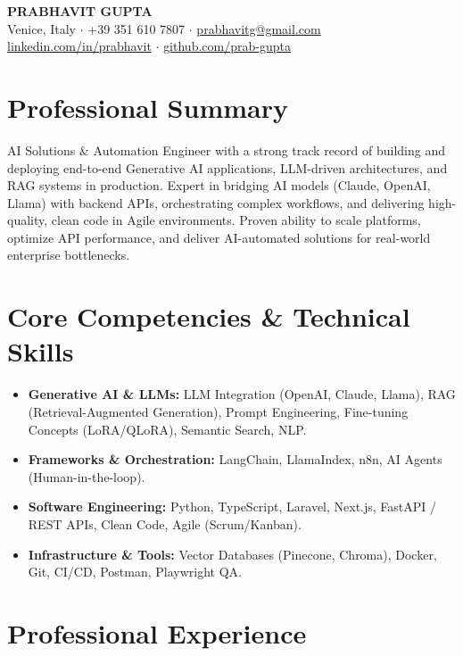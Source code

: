 \documentclass[10pt,a4paper]{article}
\begin{document}
\pagestyle{empty}

\begin{center}
    {\LARGE \textbf{PRABHAVIT GUPTA}} \\
    \vspace{4pt}
    Venice, Italy $\cdot$ +39 351 610 7807 $\cdot$ \href{mailto:prabhavitg@gmail.com}{prabhavitg@gmail.com} \\
    \href{https://linkedin.com/in/prabhavit}{linkedin.com/in/prabhavit} $\cdot$ \href{https://github.com/prab-gupta}{github.com/prab-gupta}
\end{center}

\vspace{10pt}

\section{Professional Summary}
AI Solutions \& Automation Engineer with a strong track record of building and deploying end-to-end Generative AI applications, LLM-driven architectures, and RAG systems in production. Expert in bridging AI models (Claude, OpenAI, Llama) with backend APIs, orchestrating complex workflows, and delivering high-quality, clean code in Agile environments. Proven ability to scale platforms, optimize API performance, and deliver AI-automated solutions for real-world enterprise bottlenecks.

\section{Core Competencies \& Technical Skills}
\begin{itemize}[leftmargin=*,noitemsep]
    \item \textbf{Generative AI \& LLMs:} LLM Integration (OpenAI, Claude, Llama), RAG (Retrieval-Augmented Generation), Prompt Engineering, Fine-tuning Concepts (LoRA/QLoRA), Semantic Search, NLP.
    \item \textbf{Frameworks \& Orchestration:} LangChain, LlamaIndex, n8n, AI Agents (Human-in-the-loop).
    \item \textbf{Software Engineering:} Python, TypeScript, Laravel, Next.js, FastAPI / REST APIs, Clean Code, Agile (Scrum/Kanban).
    \item \textbf{Infrastructure \& Tools:} Vector Databases (Pinecone, Chroma), Docker, Git, CI/CD, Postman, Playwright QA.
\end{itemize}

\section{Professional Experience}
\end{document}

